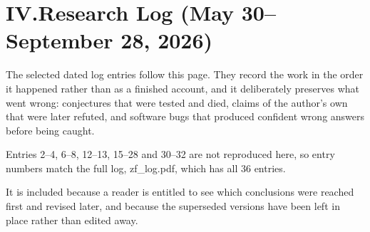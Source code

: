 \documentclass[11pt]{article}
\begin{document}
\section*{IV.\quad Research Log \hfill\normalsize\normalfont(May 30--September 28, 2026)}
The selected dated log entries follow this page. They record the work in the order it
happened rather than as a finished account, and it deliberately preserves what
went wrong: conjectures that were tested and died, claims of the author's own
that were later refuted, and software bugs that produced confident wrong answers
before being caught.

Entries 2--4, 6--8, 12--13, 15--28 and 30--32 are not reproduced here, so entry numbers match the full log, zf\_log.pdf, which has all 36 entries.

It is included because a reader is entitled to see which conclusions were
reached first and revised later, and because the superseded versions have been
left in place rather than edited away.
\end{document}
